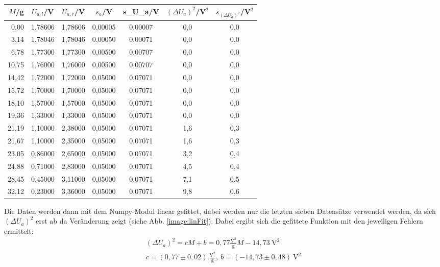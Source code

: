 \begin{center}
    \begin{tabular}{r|cccc|cc}
        $M$/g &  $U_{a,l}$/V &  $U_{a,r}$/V & $s_a$/V & s_{U_a}/V & $(\Delta U_a)^2$/V$^2$ &  $s_{(\Delta U_a)^2}$/V$^2$ \\
        \hline
         0,00  &  1,78606 &  1,78606 &   0,00005 &  0,00007 &  0,0 &     0,0 \\
         3,14  &  1,78046 &  1,78046 &   0,00050 &  0,00071 &  0,0 &     0,0 \\
         6,78  &  1,77300 &  1,77300 &   0,00500 &  0,00707 &  0,0 &     0,0 \\
        10,75  &  1,76000 &  1,76000 &   0,00500 &  0,00707 &  0,0 &     0,0 \\
        14,42  &  1,72000 &  1,72000 &   0,05000 &  0,07071 &  0,0 &     0,0 \\
        15,72  &  1,70000 &  1,70000 &   0,05000 &  0,07071 &  0,0 &     0,0 \\
        18,10  &  1,57000 &  1,57000 &   0,05000 &  0,07071 &  0,0 &     0,0 \\
        19,36  &  1,33000 &  1,33000 &   0,05000 &  0,07071 &  0,0 &     0,0 \\
        21,19  &  1,10000 &  2,38000 &   0,05000 &  0,07071 &  1,6 &     0,3 \\
        21,67  &  1,10000 &  2,35000 &   0,05000 &  0,07071 &  1,6 &     0,3 \\
        23,05  &  0,86000 &  2,65000 &   0,05000 &  0,07071 &  3,2 &     0,4 \\
        24,88  &  0,71000 &  2,83000 &   0,05000 &  0,07071 &  4,5 &     0,4 \\
        28,45  &  0,45000 &  3,11000 &   0,05000 &  0,07071 &  7,1 &     0,5 \\
        32,12  &  0,23000 &  3,36000 &   0,05000 &  0,07071 &  9,8 &     0,6 \\
    \end{tabular}
    \label{tab:gleichgewichtslage}
\end{center}
Die Daten werden dann mit dem Numpy-Modul linear gefittet, dabei werden nur die letzten sieben Datensätze verwendet werden, da sich $(\Delta U_a)^2$ erst ab da Veränderung zeigt (siehe Abb. \ref{image:linFit}). Dabei ergibt sich die gefittete Funktion mit den jeweiligen Fehlern ermittelt:
\begin{gather}
    (\Delta U_a)^2 = c M + b = 0,77 \frac{\text{V}^2}{\text{g}} M - 14,73~\text{V}^2\\
    c = (0,77 \pm 0,02)~\frac{\text{V}^2}{\text{g}},~b = (-14,73 \pm 0,48)~\text{V}^2
\end{gather}
